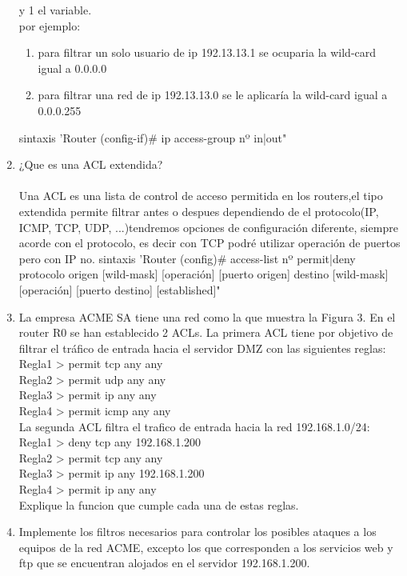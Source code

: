 \documentclass{udparticle}
\begin{document}
\begin{enumerate}
y 1 el variable.\\
por ejemplo:
\begin{enumerate}
\item para filtrar un solo usuario de ip 192.13.13.1 se ocuparia la wild-card igual a 0.0.0.0
\item para filtrar una red de ip 192.13.13.0 se le aplicaría la wild-card igual a 0.0.0.255
\end{enumerate}
sintaxis 'Router (config-if)# ip access-group nº in|out"
\item ¿Que es una ACL extendida?\\\\
Una ACL es una lista de control de acceso permitida en los routers,el tipo extendida permite filtrar antes o despues
dependiendo de el protocolo(IP, ICMP, TCP, UDP, ...)tendremos opciones de configuración diferente, siempre acorde con 
el protocolo, es decir con TCP podré utilizar operación de puertos pero con IP no.
sintaxis 'Router (config)# access-list nº permit|deny protocolo origen [wild-mask] [operación] [puerto origen] destino [wild-mask] 
[operación] [puerto destino] [established]"
\item La empresa ACME SA tiene una red como la que muestra la Figura 3. 
En el router R0 se han establecido 2 ACLs. La primera ACL tiene por 
objetivo de filtrar el tráfico de entrada hacia el 
servidor DMZ con las siguientes reglas:\\
Regla1 > permit tcp any any\\
Regla2 > permit udp any any\\
Regla3 > permit ip any any\\
Regla4 > permit icmp any any\\
La segunda ACL filtra el trafico de entrada hacia la red 
192.168.1.0/24:\\
Regla1 > deny tcp any 192.168.1.200\\
Regla2 > permit tcp any any\\
Regla3 > permit ip any 192.168.1.200\\
Regla4 > permit ip any any\\
Explique la funcion que cumple cada una de estas reglas.\\
\item Implemente los filtros necesarios para controlar los posibles ataques a los equipos de la red ACME, excepto los que corresponden
a los servicios web y ftp que se encuentran alojados en el servidor 192.168.1.200.


\end{enumerate}
\end{document}
